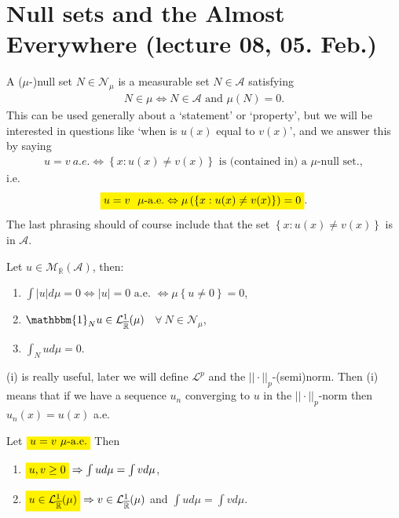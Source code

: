 \section{Null sets and the Almost Everywhere (lecture 08, 05. Feb.)}
\begin{definition}
    A (\(\mu\)-)null set \(N\in\mathcal{N}_{\mu}\) is a measurable set \(N\in\mathscr{A}\) satisfying
    \begin{align}
        N\in\mathcal{\mu} \Leftrightarrow N\in\mathscr{A} \text{ and } \mu(N) = 0.
    \end{align}
    This can be used generally about a `statement' or `property', but we will be interested in questions like 
    `when is \(u(x)\) equal to \(v(x)\)', and we answer this by saying
    \begin{align}
        u=v \ a.e. \Leftrightarrow \left\{ x: u(x) \neq v(x) \right\} \text{ is (contained in) a }\mu\text{-null set.}, 
    \end{align}
    i.e.
    \begin{align}
        \highlight[yellow]{u=v \ \  \mu\text{-a.e.} \Leftrightarrow \mu\left( \left\{ x: u(x) \neq v(x) \right\} \right) = 0}.
    \end{align}
    The last phrasing should of course include that the set \( \left\{ x: u(x) \neq v(x) \right\}\) is in \(\mathscr{A}\).
\end{definition}
\begin{theorem}
    Let \(u\in \mathcal{M}_{\overline{\mathbb{R}}}(\mathscr{A})\), then:
    \begin{enumerate}[label=(\roman*)]
        \item \(\int\vert u\vert d\mu = 0 \Leftrightarrow \vert u\vert = 0 \text{ a.e. } \Leftrightarrow \mu\left\{u\neq0\right\} = 0\),
        \item \(\mathbbm{1}_{N}u\in \mathcal{L}^{1}_{\overline{\mathbb{R}}}(\mu)\) \ \(\forall \ N\in\mathcal{N}_{\mu}\),
        \item \(\int_Nud\mu = 0\).
    \end{enumerate}
    (i) is really useful, later we will define \(\mathcal{L}^p\) and the \(||\cdot||_p\)-(semi)norm. Then (i) means that if we have a
    sequence \(u_n\) converging to \(u\) in the \(||\cdot ||_p\)-norm then \(u_n(x) = u(x)\) a.e.
\end{theorem}
\begin{corollary}
    Let \(\highlight[yellow]{u=v \ \mu \text{-a.e.}}\) Then
    \begin{enumerate}[label=(\roman*)]
        \item \(\highlight[yellow]{u,v \geq 0} \Rightarrow \int ud\mu = \int vd\mu\),
        \item \(\highlight[yellow]{u\in\mathcal{L}^{1}_{\overline{\mathbb{R}}}(\mu)} \Rightarrow v\in\mathcal{L}^{1}_{\overline{\mathbb{R}}}(\mu)\) and \(\int ud\mu = \int vd\mu\).
    \end{enumerate}
\end{corollary}
